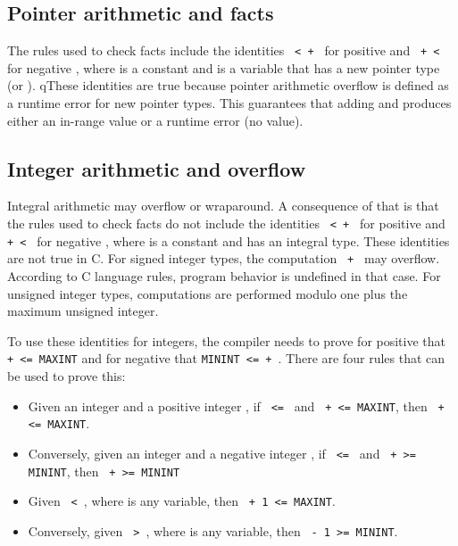 \subsection{Pointer arithmetic and facts}

The rules used to check facts include the identities \texttt{ <  + }
for positive  and \texttt{ +  < } for
negative , where  is a
constant and  is a variable that has a new pointer type (\ptr or \arrayptr).
qThese identities are true
because pointer arithmetic overflow is defined as a runtime error for
new pointer types. This guarantees that adding  and  produces either
an in-range value or a runtime error (no value).

\subsection{Integer arithmetic and overflow}
\label{section:where-clauses-and-overflow}

Integral arithmetic may overflow or wraparound. A consequence of that is
that the rules used to check facts do not include the identities 
\texttt{ <  + } 
for positive  and \texttt{ +  < } for 
negative , where  is a
constant and  has an integral type. These identities are not true in C.  For signed integer types, the computation \texttt{ + }
may overflow.   According to C language
rules, program behavior is undefined in that case.  For unsigned
integer types, computations are performed modulo one plus
the maximum unsigned integer.

To use these identities for integers, the compiler needs to prove for
positive  that \texttt{ +  <= MAXINT} and for negative  that \texttt{MININT <=  + }.  There are four rules that can be used to prove this:

\begin{itemize}
\item
  Given an integer  and a positive integer , if 
  \texttt{ <= } and \texttt{ +  <= MAXINT},
  then \texttt{ +  <= MAXINT}.
\item
  Conversely, given an integer  and a negative integer 
  , if \texttt{ <= } and \texttt{ +
    >= MININT}, then \texttt{ +  >= MININT}
\item
  Given \texttt{ < }, where  is any variable, 
  then \texttt{ + 1 <= MAXINT}.
\item
  Conversely, given \texttt{ > }, where 
  is any variable, then \texttt{ - 1 >= MININT}.
\end{itemize}

